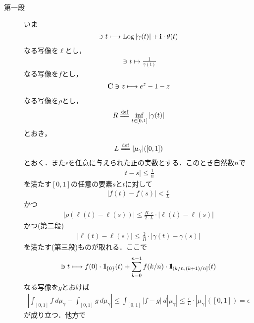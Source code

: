 	\begin{sketch}\mbox{}
		\begin{description}
			\item[第一段]
				いま
				\begin{align}
					[0,1] \ni t \longmapsto \pvlog{|\gamma(t)|} + \isym \cdot \theta(t)
				\end{align}
				なる写像を$\ell$とし，
				\begin{align}
					[0,1] \ni t \longmapsto \frac{1}{\gamma(t)}
				\end{align}
				なる写像を$f$とし，
				\begin{align}
					\mathbf{C} \ni z \longmapsto e^{z} - 1 - z
				\end{align}
				なる写像を$\rho$とし，
				\begin{align}
					R \defeq \inf{t \in [0,1]}{|\gamma(t)|}
				\end{align}
				とおき，
				\begin{align}
					L \defeq |\mu_{\gamma}|([0,1])
				\end{align}
				とおく．また$\epsilon$を任意に与えられた正の実数とする．このとき自然数$n$で
				\begin{align}
					|t - s| \leq \frac{1}{n}
				\end{align}
				を満たす$[0,1]$の任意の要素$s$と$t$に対して
				\begin{align}
					|f(t) - f(s)| < \frac{\epsilon}{L}
				\end{align}
				かつ
				\begin{align}
					\left|\rho(\ell(t) - \ell(s))\right| \leq \frac{R \cdot \epsilon}{2 \cdot L} \cdot |\ell(t) - \ell(s)| 
				\end{align}
				かつ(第二段)
				\begin{align}
					|\ell(t) - \ell(s)| \leq \frac{2}{R} \cdot |\gamma(t) - \gamma(s)|
				\end{align}
				を満たす(第三段)ものが取れる．ここで
				\begin{align}
					[0,1] \ni t \longmapsto f(0) \cdot \defunc_{\{0\}}(t)
					+ \sum_{k=0}^{n-1} f(k/n) \cdot \defunc_{(k/n,(k+1)/n]}(t)
				\end{align}
				なる写像を$g$とおけば
				\begin{align}
					\left|\int_{[0,1]} f\ d\mu_{\gamma} - \int_{[0,1]} g\ d\mu_{\gamma}\right|
					\leq \int_{[0,1]} |f-g|\ d|\mu_{\gamma}|
					\leq \frac{\epsilon}{L} \cdot |\mu_{\gamma}|([0,1])
					= \epsilon
				\end{align}
				が成り立つ．他方で
				\begin{align}

\end{align}
\end{description}
\end{sketch}
